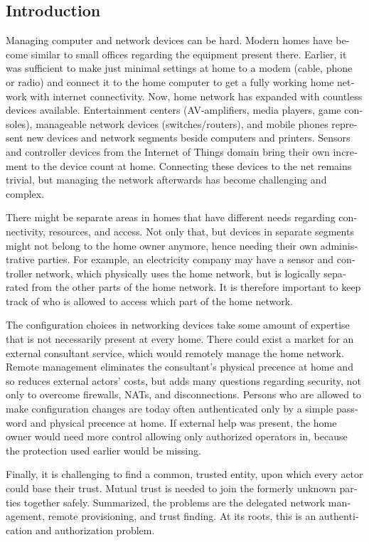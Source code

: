 \documentclass[12pt,a4paper,english]{tutthesis}
\begin{document}
\begin{otherlanguage}{english}
\chapter{Introduction}
\label{sec-1}
\label{cha:intro}


Managing computer and network devices can be hard.  Modern homes have
become similar to small offices regarding the equipment present there.
Earlier, it was sufficient to make just minimal settings at home to a
modem (cable, phone or radio) and connect it to the home computer to
get a fully working home network with internet connectivity.  Now, home
network has expanded with countless devices available. 
Entertainment centers (AV-amplifiers, media players, game consoles),
manageable network devices (switches/routers), and mobile phones
represent new devices and network segments beside computers and
printers. Sensors and controller devices from the Internet of Things
domain bring their own increment to the device count at home.
Connecting these devices to the net remains trivial, but managing the
network afterwards has become challenging and complex.

There might be separate areas in homes that have different needs regarding
connectivity, resources, and access. Not only that, but devices in
separate segments might not belong to the home owner anymore, hence needing
their own administrative parties. For example, an electricity company may
have a sensor and controller network, which physically uses the home network, but
is logically separated from the other parts of the home network. It is therefore
important to keep track of who is allowed to access which part of the
home network. 


The configuration choices in networking devices take some
amount of expertise that is not necessarily present at every
home. There could exist a market for an external consultant service, which would
remotely manage the home network.
Remote management eliminates the consultant's 
physical precence at home and so reduces external actors' costs, but adds many questions
regarding security, not only to overcome firewalls, NATs, and disconnections.
Persons who are allowed to make configuration changes are today
often authenticated only by a simple password and physical precence at home.
If external help was present, the home owner would need more 
control allowing only authorized operators in, because the 
protection used earlier would be missing.

Finally, it is challenging to find a common, 
trusted entity, upon which every actor could base their trust.
Mutual trust
 is needed to join the formerly unknown parties together
safely. 
Summarized, the problems are the delegated network management, remote
provisioning, and trust finding. At its roots, this is an authentication
and authorization problem.









\end{otherlanguage}
\end{document}
